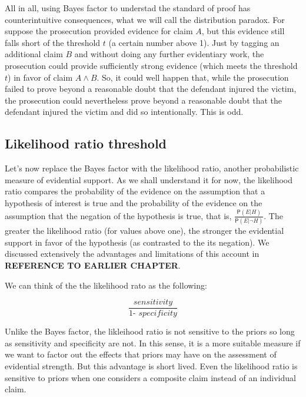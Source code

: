 \documentclass[10pt,dvipsnames,enabledeprecatedfontcommands]{scrartcl}
\newcommand{\pr}[1]{\mathsf{P}(#1)}
\begin{document}
All in all, using Bayes factor to understad the standard of proof has
counterintuitive consequences, what we will call the distribution
paradox. For suppose the prosecution provided evidence for claim \(A\),
but this evidence still falls short of the threshold \(t\) (a certain
number above 1). Just by tagging an additional claim \(B\) and without
doing any further evidentiary work, the prosecution could provide
sufficiently strong evidence (which meets the threshold \(t\)) in favor
of claim \(A \wedge B\). So, it could well happen that, while the
prosecution failed to prove beyond a reasonable doubt that the defendant
injured the victim, the prosecution could nevertheless prove beyond a
reasonable doubt that the defendant injured the victim and did so
intentionally. This is odd.

\hypertarget{likelihood-ratio-threshold}{%
\subsection{Likelihood ratio
threshold}\label{likelihood-ratio-threshold}}

Let's now replace the Bayes factor with the likelihood ratio, another
probabilistic measure of evidential support. As we shall understand it
for now, the likelihood ratio compares the probability of the evidence
on the assumption that a hypothesis of interest is true and the
probability of the evidence on the assumption that the negation of the
hypothesis is true, that is,
\(\frac{\pr{E \vert H}}{\pr{E \vert \neg H}}\). The greater the
likelihood ratio (for values above one), the stronger the evidential
support in favor of the hypothesis (as contrasted to the its negation).
We discussed extensively the advantages and limitations of this account
in \textbf{REFERENCE TO EARLIER CHAPTER}.

We can think of the the likelihood rato as the following:

\[\frac{\textit{sensitivity}}{\textit{1- specificity}}\]

\noindent Unlike the Bayes factor, the likleihood ratio is not sensitive
to the priors so long as sensitivity and specificity are not. In this
sense, it is a more suitable measure if we want to factor out the
effects that priors may have on the assessment of evidential strength.
But this advantage is short lived. Even the likelihood ratio is
sensitive to priors when one considers a composite claim instead of an
individual claim.
\end{document}
